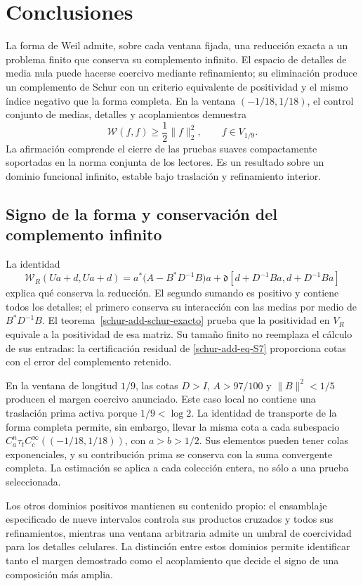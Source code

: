 \section{Conclusiones}
\label{rz:conclusiones}

La forma de Weil admite, sobre cada ventana fijada, una
reducción exacta a un problema finito que conserva su
complemento infinito. El espacio de detalles de media nula
puede hacerse coercivo mediante refinamiento; su eliminación
produce un complemento de Schur con un criterio equivalente de
positividad y el mismo índice negativo que la forma completa. En la ventana
$(-1/18,1/18)$, el control conjunto de medias, detalles y
acoplamientos demuestra
\[
\mathscr W(f,f)\geq\frac12\|f\|_2^2,
\qquad f\in V_{1/9}.
\]
La afirmación comprende el cierre de las pruebas suaves
compactamente soportadas en la norma conjunta de los lectores.
Es un resultado sobre un dominio funcional infinito, estable
bajo traslación y refinamiento interior.

\subsection*{Signo de la forma y conservación del complemento infinito}

La identidad
\[
\mathscr W_R(Ua+d,Ua+d)
=a^*\bigl(A-B^*D^{-1}B\bigr)a
+\mathfrak d[d+D^{-1}Ba,d+D^{-1}Ba]
\]
explica qué conserva la reducción. El segundo sumando es
positivo y contiene todos los detalles; el primero conserva
su interacción con las medias por medio de $B^*D^{-1}B$.
El teorema~\ref{schur-add-schur-exacto} prueba que la
positividad en $V_R$ equivale a la positividad de esa matriz.
Su tamaño finito no reemplaza el cálculo de sus entradas:
la certificación residual de
\eqref{schur-add-eq-S7} proporciona cotas con el error del
complemento retenido.

En la ventana de longitud $1/9$, las cotas
$D>I$, $A>97/100$ y $\|B\|^2<1/5$ producen el margen
coercivo anunciado. Este caso local no contiene una traslación
prima activa porque $1/9<\log2$. La identidad de transporte
de la forma completa permite, sin embargo, llevar la misma
cota a cada subespacio $C_a^n\tau_t C_c^\infty((-1/18,1/18))$,
con $a>b>1/2$. Sus elementos pueden tener colas exponenciales,
y su contribución prima se conserva con la suma convergente
completa. La estimación se aplica a cada colección entera, no
sólo a una prueba seleccionada.

Los otros dominios positivos mantienen su contenido propio:
el ensamblaje especificado de nueve intervalos controla sus
productos cruzados y todos sus refinamientos, mientras una
ventana arbitraria admite un umbral de coercividad para los
detalles celulares. La distinción entre estos dominios permite
identificar tanto el margen demostrado como el acoplamiento
que decide el signo de una composición más amplia.

